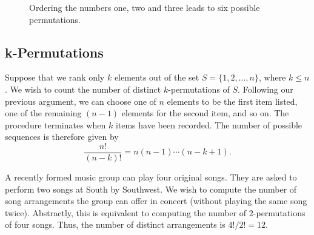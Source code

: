\begin{figure}[htb!]
\begin{center}
\begin{footnotesize}
\end{footnotesize}
\caption{Ordering the numbers one, two and three leads to six possible permutations.}
\label{figure:Permutation}
\end{center}
\end{figure}


\subsection{k-Permutations}

Suppose that we rank only $k$ elements out of the set $S = \{ 1, 2, \ldots, n \}$, where $k \leq n$.
We wish to count the number of distinct $k$-permutations of $S$.
Following our previous argument, we can choose one of $n$ elements to be the first item listed, one of the remaining $(n-1)$ elements for the second item, and so on.
The procedure terminates when $k$ items have been recorded.
The number of possible sequences is therefore given by
\begin{equation*}
\frac{n!}{(n-k)!} = n (n-1) \cdots (n-k+1) .
\end{equation*}

\begin{example}
A recently formed music group can play four original songs.
They are asked to perform two songs at South by Southwest.
We wish to compute the number of song arrangements the group can offer in concert (without playing the same song twice).
Abstractly, this is equivalent to computing the number of $2$-permutations of four songs.
Thus, the number of distinct arrangements is ${4!}/{2!} = 12$.
\end{example}

